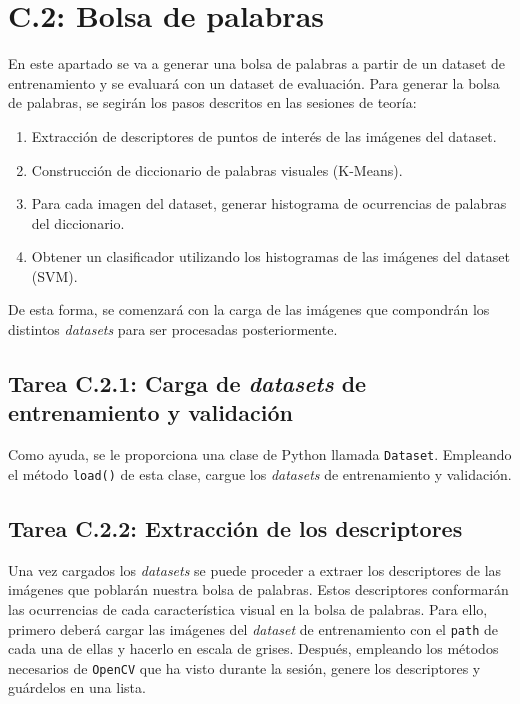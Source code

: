 \newpage
\section*{C.2: Bolsa de palabras}
{}

En este apartado se va a generar una bolsa de palabras a partir de un dataset de entrenamiento y se evaluará con un dataset de evaluación. Para generar la bolsa de palabras, se segirán los pasos descritos en las sesiones de teoría:

\begin{enumerate}
    \item Extracción de descriptores de puntos de interés de las imágenes del dataset.
    \item Construcción de diccionario de palabras visuales (K-Means).
    \item Para cada imagen del dataset, generar histograma de ocurrencias de palabras del diccionario.
    \item Obtener un clasificador utilizando los histogramas de las imágenes del dataset (SVM).
\end{enumerate}

De esta forma, se comenzará con la carga de las imágenes que compondrán los distintos \textit{datasets} para ser procesadas posteriormente.

\subsection*{Tarea C.2.1: Carga de \textit{datasets} de entrenamiento y validación}

Como ayuda, se le proporciona una clase de Python llamada \texttt{Dataset}. Empleando el método \texttt{load()} de esta clase, cargue los \textit{datasets} de entrenamiento y validación.

\subsection*{Tarea C.2.2: Extracción de los descriptores}

Una vez cargados los \textit{datasets} se puede proceder a extraer los descriptores de las imágenes que poblarán nuestra bolsa de palabras. Estos descriptores conformarán las ocurrencias de cada característica visual en la bolsa de palabras. Para ello, primero deberá cargar las imágenes del \textit{dataset} de entrenamiento con el \texttt{path} de cada una de ellas y hacerlo en escala de grises. Después, empleando los métodos necesarios de \texttt{OpenCV} que ha visto durante la sesión, genere los descriptores y guárdelos en una lista.

